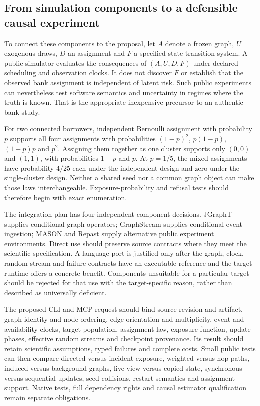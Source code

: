 \subsection{From simulation components to a defensible causal experiment}

To connect these components to the proposal, let $A$ denote a frozen graph, $U$ exogenous draws, $D$ an assignment and $F$ a specified state-transition system. A public simulator evaluates the consequences of $(A,U,D,F)$ under declared scheduling and observation clocks. It does not discover $F$ or establish that the observed bank assignment is independent of latent risk. Such public experiments can nevertheless test software semantics and uncertainty in regimes where the truth is known. That is the appropriate inexpensive precursor to an authentic bank study.~\citep{exec25_jnet_choice}

For two connected borrowers, independent Bernoulli assignment with probability $p$ supports all four assignments with probabilities $(1-p)^2$, $p(1-p)$, $(1-p)p$ and $p^2$. Assigning them together as one cluster supports only $(0,0)$ and $(1,1)$, with probabilities $1-p$ and $p$. At $p=1/5$, the mixed assignments have probability $4/25$ each under the independent design and zero under the single-cluster design. Neither a shared seed nor a common graph object can make those laws interchangeable. Exposure-probability and refusal tests should therefore begin with exact enumeration.~\citep{exec25_jnet_choice}

The integration plan has four independent component decisions. JGraphT supplies conditional graph operators; GraphStream supplies conditional event ingestion; MASON and Repast supply alternative public experiment environments. Direct use should preserve source contracts where they meet the scientific specification. A language port is justified only after the graph, clock, random-stream and failure contracts have an executable reference and the target runtime offers a concrete benefit. Components unsuitable for a particular target should be rejected for that use with the target-specific reason, rather than described as universally deficient.~\citep{exec25_jnet_choice}

The proposed CLI and MCP request should bind source revision and artifact, graph identity and node ordering, edge orientation and multiplicity, event and availability clocks, target population, assignment law, exposure function, update phases, effective random streams and checkpoint provenance. Its result should retain scientific assumptions, typed failures and complete costs. Small public tests can then compare directed versus incident exposure, weighted versus hop paths, induced versus background graphs, live-view versus copied state, synchronous versus sequential updates, seed collisions, restart semantics and assignment support. Native tests, full dependency rights and causal estimator qualification remain separate obligations.~\citep{exec25_jnet_choice}

